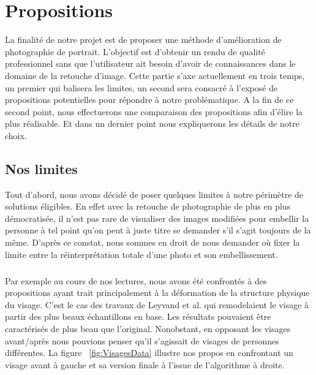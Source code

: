\documentclass[11pt, french]{report-rd-info}
\begin{document}
\chapter{Propositions}
\label{chap:Propositions}
La finalité de notre projet est de proposer une méthode d'amélioration de photographie de portrait. L’objectif est d’obtenir un rendu de qualité professionnel sans que l’utilisateur ait besoin d’avoir de connaissances dans le domaine de la retouche d’image.
Cette partie s’axe actuellement en trois temps, un premier qui balisera les limites, un second sera consacré à l’exposé de propositions potentielles pour répondre à notre problématique. A la fin de ce second point, nous effectuerons une comparaison des propositions afin d’élire la plus réalisable. Et dans un dernier point nous expliquerons les détails de notre choix.

\section{Nos limites}
Tout d’abord, nous avons décidé de poser quelques limites à notre périmètre de solutions éligibles. En effet avec la retouche de photographie de plus en plus démocratisée, il n’est pas rare de visualiser des images modifiées pour embellir la personne à tel point qu’on peut à juste titre se demander s’il s’agit toujours de la même. D’après ce constat, nous sommes en droit de nous demander où fixer la limite entre la réinterprétation totale d’une photo et son embellissement.
\paragraph*{}
Par exemple au cours de nos lectures, nous avons été confrontés à des propositions ayant trait principalement à la déformation de la structure physique du visage. C'est le cas des travaux de Leyvand et al. \cite{Leyvand2008} qui remodelaient le visage à partir des plus beaux échantillons en base. Les résultats pouvaient être caractérisés de plus beau que l’original. Nonobstant, en opposant les visages avant/après nous pouvions penser qu’il s'agissait de visages de personnes différentes. La figure ~\ref{fig:VisagesData} illustre nos propos en confrontant un visage avant à gauche et sa version finale à l’issue de l’algorithme à droite.
\end{document}
